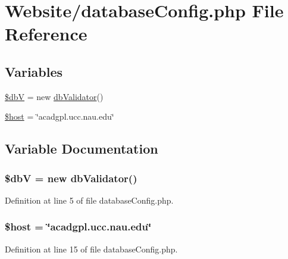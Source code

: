 \hypertarget{database_config_8php}{\section{Website/database\-Config.php File Reference}
\label{database_config_8php}
}
\subsection*{Variables}
\begin{DoxyCompactItemize}
\item 
\hyperlink{database_config_8php_aff4c1dc929e7748b654dc5295a5291c0}{\$db\-V} = new \hyperlink{classdb_validator}{db\-Validator}()
\item 
\hyperlink{database_config_8php_a711797613cb863ca0756df789c396bf2}{\$host} = \char`\"{}acadgpl.\-ucc.\-nau.\-edu\char`\"{}
\end{DoxyCompactItemize}


\subsection{Variable Documentation}
\hypertarget{database_config_8php_aff4c1dc929e7748b654dc5295a5291c0}{
\subsubsection[{\$db\-V}]{\setlength{\rightskip}{0pt plus 5cm}\$db\-V = new {\bf db\-Validator}()}}\label{database_config_8php_aff4c1dc929e7748b654dc5295a5291c0}


Definition at line 5 of file database\-Config.\-php.

\hypertarget{database_config_8php_a711797613cb863ca0756df789c396bf2}{
\subsubsection[{\$host}]{\setlength{\rightskip}{0pt plus 5cm}\$host = \char`\"{}acadgpl.\-ucc.\-nau.\-edu\char`\"{}}}\label{database_config_8php_a711797613cb863ca0756df789c396bf2}


Definition at line 15 of file database\-Config.\-php.

